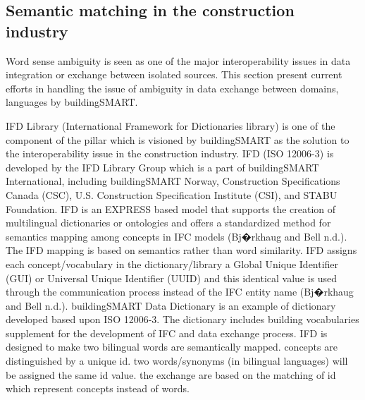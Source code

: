 \documentclass[Journal, InsideFigs, DoubleSpace]{ascelike} %
\begin{document}
\subsection{Semantic matching in the construction industry}
Word sense ambiguity is seen as one of the major interoperability issues in data integration or exchange between isolated sources. This section present current efforts in handling the issue of ambiguity in data exchange between domains, languages by buildingSMART.
\par
IFD Library (International Framework for Dictionaries library) is one of the component of the pillar which is visioned by buildingSMART as the solution to the interoperability issue in the construction industry. IFD (ISO 12006-3) is developed by the IFD Library Group which is a part of buildingSMART International, including buildingSMART Norway, Construction Specifications Canada (CSC), U.S. Construction Specification Institute (CSI), and STABU Foundation.  IFD is an EXPRESS based model that supports the creation of multilingual dictionaries or ontologies and offers a standardized method for semantics mapping among concepts in IFC models (Bj�rkhaug and Bell n.d.). The IFD mapping is based on semantics rather than word similarity. IFD assigns each concept/vocabulary in the dictionary/library a Global Unique Identifier (GUI) or Universal Unique Identifier (UUID) and this identical value is used through the communication process instead of the IFC entity name (Bj�rkhaug and Bell n.d.). buildingSMART Data Dictionary is an example of dictionary developed based upon ISO 12006-3. The dictionary includes building vocabularies supplement for the development of IFC and data exchange process. IFD is designed to make two bilingual words are semantically mapped. concepts are distinguished by a unique id. two words/synonyms (in bilingual languages) will be assigned the same id value. the exchange are based on the matching of id which represent concepts instead of words. 

%
\end{document}
